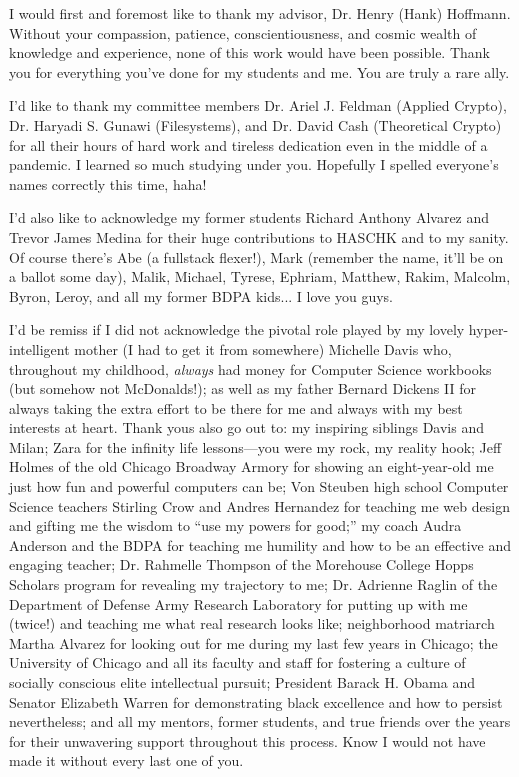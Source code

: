 \acknowledgments
I would first and foremost like to thank my advisor, Dr. Henry (Hank) Hoffmann.
Without your compassion, patience, conscientiousness, and cosmic wealth of
knowledge and experience, none of this work would have been possible. Thank you
for everything you've done for my students and me. You are truly a rare ally.

I'd like to thank my committee members Dr. Ariel J. Feldman (Applied Crypto),
Dr. Haryadi S. Gunawi (Filesystems), and Dr. David Cash (Theoretical Crypto) for
all their hours of hard work and tireless dedication even in the middle of a
pandemic. I learned so much studying under you. Hopefully I spelled everyone's
names correctly this time, haha!

I'd also like to acknowledge my former students Richard Anthony Alvarez and
Trevor James Medina for their huge contributions to HASCHK and to my sanity. Of
course there's Abe (a fullstack flexer!), Mark (remember the name, it'll be on a
ballot some day), Malik, Michael, Tyrese, Ephriam, Matthew, Rakim, Malcolm,
Byron, Leroy, and all my former BDPA kids... I love you guys.

I'd be remiss if I did not acknowledge the pivotal role played by my lovely
hyper-intelligent mother (I had to get it from somewhere) Michelle Davis who,
throughout my childhood, \emph{always} had money for Computer Science workbooks
(but somehow not McDonalds!); as well as my father Bernard Dickens II for always
taking the extra effort to be there for me and always with my best interests at
heart. Thank yous also go out to: my inspiring siblings Davis and Milan; Zara
for the infinity life lessons---you were my rock, my reality hook; Jeff Holmes
of the old Chicago Broadway Armory for showing an eight-year-old me just how fun
and powerful computers can be; Von Steuben high school Computer Science teachers
Stirling Crow and Andres Hernandez for teaching me web design and gifting me the
wisdom to ``use my powers for good;'' my coach Audra Anderson and the BDPA for
teaching me humility and how to be an effective and engaging teacher; Dr.
Rahmelle Thompson of the Morehouse College Hopps Scholars program for revealing
my trajectory to me; Dr. Adrienne Raglin of the Department of Defense Army
Research Laboratory for putting up with me (twice!) and teaching me what real
research looks like; neighborhood matriarch Martha Alvarez for looking out for
me during my last few years in Chicago; the University of Chicago and all its
faculty and staff for fostering a culture of socially conscious elite
intellectual pursuit; President Barack H. Obama and Senator Elizabeth Warren for
demonstrating black excellence and how to persist nevertheless; and all my
mentors, former students, and true friends over the years for their unwavering
support throughout this process. Know I would not have made it without every
last one of you.

